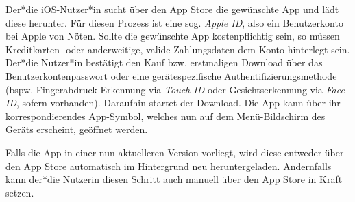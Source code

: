 Der*die iOS-Nutzer*in sucht über den App Store die gewünschte App und lädt diese herunter. Für diesen Prozess ist eine sog. \textit{Apple ID}, also ein Benutzerkonto bei Apple von Nöten. Sollte die gewünschte App kostenpflichtig sein, so müssen Kreditkarten- oder anderweitige, valide Zahlungsdaten dem Konto hinterlegt sein. Der*die Nutzer*in bestätigt den Kauf bzw. erstmaligen Download über das Benutzerkontenpasswort oder eine gerätespezifische Authentifizierungsmethode (bspw. Fingerabdruck-Erkennung via \textit{Touch ID} oder Gesichtserkennung via \textit{Face ID}, sofern vorhanden). Daraufhin startet der Download. Die App kann über ihr korrespondierendes App-Symbol, welches nun auf dem Menü-Bildschirm des Geräts erscheint, geöffnet werden.

Falls die App in einer nun aktuelleren Version vorliegt, wird diese entweder über den App Store automatisch im Hintergrund neu heruntergeladen. Andernfalls kann der*die Nutzerin diesen Schritt auch manuell über den App Store in Kraft setzen.
